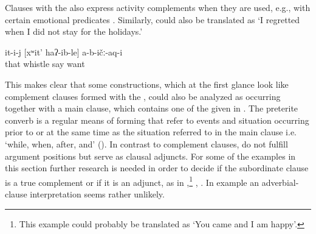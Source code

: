 Clauses with the  also express activity complements when they are used, e.g., with certain emotional predicates . Similarly,  could also be translated as `I regretted when I did not stay for the holidays.' 

%
\begin{exe}
	\ex	\label{ex:He did not like when one whistled}
	\gll	it-i-j	[xʷit'	haʔ-ib-le]	a-b-ičː-aq-i\\
		that	whistle	say	want\\
	\glt	{}
\end{exe}

This makes clear that some constructions, which at the first glance look like complement clauses formed with the , could also be analyzed as  occurring together with a main clause, which contains one of the  given in . The preterite converb is a regular means of forming  that refer to events and situation occurring prior to or at the same time as the situation referred to in the main clause i.e. `while, when, after, and' (). In contrast to complement clauses,  do not fulfill argument positions but serve as clausal adjuncts. For some of the examples in this section further research is needed in order to decide if the subordinate clause is a true complement or if it is an adjunct, as in ,\footnote{This example could probably be translated as `You came and I am happy'.} , . In example  an adverbial-clause interpretation seems rather unlikely.

